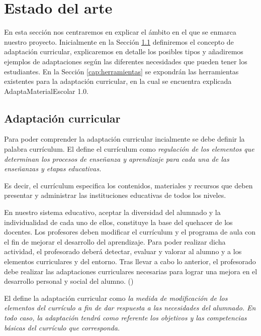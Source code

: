 \chapter{Estado del arte}
\label{cap:estadoDelArte}
En esta sección nos centraremos en explicar el ámbito en el que se enmarca nuestro proyecto. Inicialmente en la Sección \ref{cap:adaptacion} definiremos el concepto de adaptación curricular, explicaremos en detalle los posibles tipos y añadiremos ejemplos de adaptaciones según las diferentes necesidades que pueden tener los estudiantes. En la Sección \ref{cap:herramientas}  se expondrán las herramientas existentes para la adaptación curricular, en la cual se encuentra explicada AdaptaMaterialEscolar 1.0.

\section{Adaptación curricular}\label{cap:adaptacion}
Para poder comprender la adaptación curricular incialmente se debe definir la palabra currículum. El \citep[p. 5, Artículo 2]{BOE2} define el currículum como \textit{ regulación de los elementos que determinan los procesos de enseñanza y aprendizaje para cada una de las enseñanzas y etapas educativas.}
\newline

Es decir, el currículum especifica los contenidos, materiales y recursos que deben presentar y administrar las instituciones educativas de todos los niveles.
\newline

En nuestro sistema educativo, aceptar la diversidad del alumnado y la individualidad de cada uno de ellos, constituye la base del quehacer de los docentes. Los profesores deben modificar el currículum y el programa de aula con el fin de mejorar el desarrollo del aprendizaje. Para poder realizar dicha actividad, el profesorado deberá detectar, evaluar y valorar al alumno y a los elementos curriculares y del entorno. Tras llevar a cabo lo anterior, el profesorado debe realizar las adaptaciones curriculares necesarias para lograr una mejora en el desarrollo personal y social del alumno. (\cite{adaptacionIntro})
\newline

El \citep[p. 7, Artículo 7]{BOE} define la adaptación curricular como \textit{la medida de modificación de los elementos del currículo a fin de dar respuesta a las necesidades del alumnado. En todo caso, la adaptación tendrá como referente los objetivos y las competencias básicas del currículo que corresponda.}
\newline

